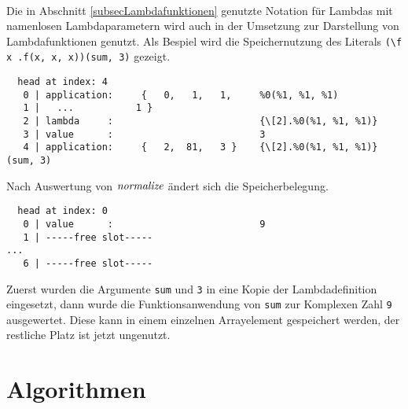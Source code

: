 \begin{beispiel}~\\ \label{bspREPLlambda}
Die in Abschnitt \ref{subsecLambdafunktionen} genutzte Notation für Lambdas mit namenlosen Lambdaparametern wird auch in der Umsetzung zur Darstellung von Lambdafunktionen genutzt. Als Bespiel wird die Speichernutzung des Literals \verb|(\f x .f(x, x, x))(sum, 3)| gezeigt.
\begin{verbatim}
  head at index: 4
   0 | application:     {   0,   1,   1,     %0(%1, %1, %1)
   1 |   ...           1 }
   2 | lambda     :                          {\[2].%0(%1, %1, %1)}
   3 | value      :                          3
   4 | application:     {   2,  81,   3 }    {\[2].%0(%1, %1, %1)}(sum, 3)
\end{verbatim}
Nach Auswertung von $\mathit{normalize}$ ändert sich die Speicherbelegung.
\begin{verbatim}
  head at index: 0
   0 | value      :                          9
   1 | -----free slot-----
...
   6 | -----free slot-----
\end{verbatim}
Zuerst wurden die Argumente \verb|sum| und \verb|3| in eine Kopie der Lambdadefinition eingesetzt, dann wurde die Funktionsanwendung von \verb|sum| zur Komplexen Zahl \verb|9| ausgewertet. Diese kann in einem einzelnen Arrayelement gespeichert werden, der restliche Platz ist jetzt ungenutzt.
\end{beispiel}


\section{Algorithmen} \label{subsecCppAlgos}
















